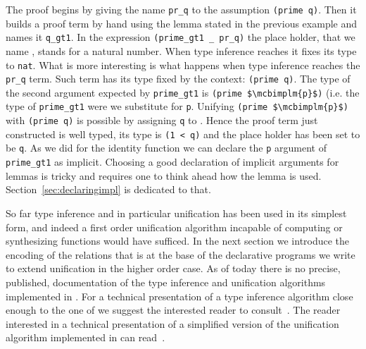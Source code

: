 The proof begins by giving the name \lstinline/pr_q/ to the assumption
\lstinline/(prime q)/.  Then it builds a proof term by hand using
the lemma stated in the previous example and names it \lstinline/q_gt1/.
In the expression \lstinline/(prime_gt1 _ pr_q)/ the place holder,
that we name , stands for a natural number.
When type inference reaches  it fixes its type to \lstinline/nat/.
What is more interesting is what happens when type inference reaches the
\lstinline/pr_q/ term.  Such term has its type fixed by the context:
\lstinline/(prime q)/.  The type of the second argument expected by
\lstinline/prime_gt1/ is \lstinline/(prime $\mcbimplm{p}$)/ (i.e. the
type of \lstinline/prime_gt1/ were we substitute  for
\lstinline/p/.  Unifying \lstinline/(prime $\mcbimplm{p}$)/ with
\lstinline/(prime q)/ is possible by assigning \lstinline/q/ to
.  Hence the proof term just constructed is
well typed, its type is \lstinline/(1 < q)/ and the place holder
has been set to be \lstinline{q}.
As we did for the identity function we can declare the \lstinline/p/
argument of \lstinline/prime_gt1/ as implicit.  
Choosing a good  declaration of implicit arguments for lemmas is
tricky and requires one to think ahead how the lemma is used.
Section~\ref{sec:declaringimpl} is dedicated to that.

So far type inference and in particular unification has been used in
its simplest form, and indeed a first order unification algorithm
incapable of computing or synthesizing functions would have sufficed.
In the next section we introduce the encoding of the relations that
is at the base of the declarative programs we write to
extend unification in the higher order case.
As of today there is no precise, published, documentation of the type
inference and unification algorithms implemented in \Coq{}.  For a
technical presentation of a type inference algorithm close enough to
the one of \Coq{} we suggest the interested reader to
consult~\cite{DBLP:journals/corr/abs-1202-4905}.  The reader
interested in a technical presentation of a simplified version of the
unification algorithm implemented in \Coq{} can
read~\cite{unifcoq,betaderekjournal}.

\mcbREQUIRE{}
\mcbNOTES{}

